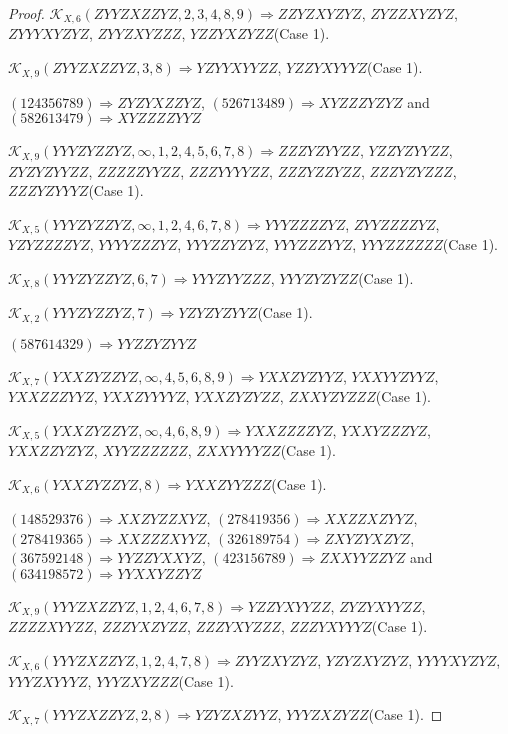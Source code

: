 \documentclass[12pt]{article}
\theoremstyle{plain}
\theoremstyle{definition}
\theoremstyle{remark}
\newcommand{\fancy}[1]{\mathcal{#1}}
\def\K{\fancy{K}}
\begin{document}
\begin{proof}
	$\K_{X,6}(ZYYZXZZYZ,2, 3, 4, 8, 9)\Rightarrow $$ZZYZXYZYZ$, $ZYZZXYZYZ$, $ZYYYXYZYZ$, $ZYYZXYZZZ$, $YZZYXZYZZ$(Case 1).
	
	$\K_{X,9}(ZYYZXZZYZ,3, 8)\Rightarrow $$YZYYXYYZZ$, $YZZYXYYYZ$(Case 1).
	
	
	
	$(1 2 4 3 5 6 7 8 9)\Rightarrow ZYZYXZZYZ$, $(5 2 6 7 1 3 4 8 9)\Rightarrow XYZZZYZYZ$ and $(5 8 2 6 1 3 4 7 9)\Rightarrow XYZZZZYYZ$
	
	
	$\K_{X,9}(YYYZYZZYZ,\infty,1, 2, 4, 5, 6, 7, 8)\Rightarrow $$ZZZYZYYZZ$, $YZZYZYYZZ$, $ZYZYZYYZZ$, $ZZZZZYYZZ$, $ZZZYYYYZZ$, $ZZZYZZYZZ$, $ZZZYZYZZZ$, $ZZZYZYYYZ$(Case 1).
	
	$\K_{X,5}(YYYZYZZYZ,\infty,1, 2, 4, 6, 7, 8)\Rightarrow $$YYYZZZZYZ$, $ZYYZZZZYZ$, $YZYZZZZYZ$, $YYYYZZZYZ$, $YYYZZYZYZ$, $YYYZZZYYZ$, $YYYZZZZZZ$(Case 1).
	
	$\K_{X,8}(YYYZYZZYZ,6, 7)\Rightarrow $$YYYZYYZZZ$, $YYYZYZYZZ$(Case 1).
	
	$\K_{X,2}(YYYZYZZYZ,7)\Rightarrow $$YZYZYZYYZ$(Case 1).
	
	
	
	$(5 8 7 6 1 4 3 2 9)\Rightarrow YYZZYZYYZ$
	
	
	$\K_{X,7}(YXXZYZZYZ,\infty,4, 5, 6, 8, 9)\Rightarrow $$YXXZYZYYZ$, $YXXYYZYYZ$, $YXXZZZYYZ$, $YXXZYYYYZ$, $YXXZYZYZZ$, $ZXXYZYZZZ$(Case 1).
	
	$\K_{X,5}(YXXZYZZYZ,\infty,4, 6, 8, 9)\Rightarrow $$YXXZZZZYZ$, $YXXYZZZYZ$, $YXXZZYZYZ$, $XYYZZZZZZ$, $ZXXYYYYZZ$(Case 1).
	
	$\K_{X,6}(YXXZYZZYZ,8)\Rightarrow $$YXXZYYZZZ$(Case 1).
	
	
	
	$(1 4 8 5 2 9 3 7 6)\Rightarrow XXZYZZXYZ$, $(2 7 8 4 1 9 3 5 6)\Rightarrow XXZZXZYYZ$, $(2 7 8 4 1 9 3 6 5)\Rightarrow XXZZZXYYZ$, $(3 2 6 1 8 9 7 5 4)\Rightarrow ZXYZYXZYZ$, $(3 6 7 5 9 2 1 4 8)\Rightarrow YYZZYXXYZ$, $(4 2 3 1 5 6 7 8 9)\Rightarrow ZXXYYZZYZ$ and $(6 3 4 1 9 8 5 7 2)\Rightarrow YYXXYZZYZ$
	
	
	$\K_{X,9}(YYYZXZZYZ,1, 2, 4, 6, 7, 8)\Rightarrow $$YZZYXYYZZ$, $ZYZYXYYZZ$, $ZZZZXYYZZ$, $ZZZYXZYZZ$, $ZZZYXYZZZ$, $ZZZYXYYYZ$(Case 1).
	
	$\K_{X,6}(YYYZXZZYZ,1, 2, 4, 7, 8)\Rightarrow $$ZYYZXYZYZ$, $YZYZXYZYZ$, $YYYYXYZYZ$, $YYYZXYYYZ$, $YYYZXYZZZ$(Case 1).
	
	$\K_{X,7}(YYYZXZZYZ,2, 8)\Rightarrow $$YZYZXZYYZ$, $YYYZXZYZZ$(Case 1).
	
	
	

\end{proof}
\end{document}
